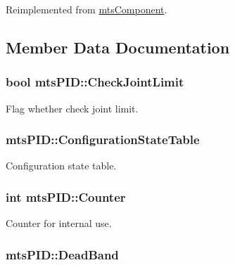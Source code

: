 Reimplemented from \hyperlink{classmts_component_aaf28f0262b44eb6866e10089a02fa6e4}{mts\-Component}.



\subsection{Member Data Documentation}
\hypertarget{classmts_p_i_d_a951636db1802cb277a716bd8ee8aea45}{
\subsubsection[{Check\-Joint\-Limit}]{\setlength{\rightskip}{0pt plus 5cm}bool mts\-P\-I\-D\-::\-Check\-Joint\-Limit\hspace{0.3cm}{\ttfamily [protected]}}}\label{classmts_p_i_d_a951636db1802cb277a716bd8ee8aea45}


Flag whether check joint limit. 

\hypertarget{classmts_p_i_d_a06df8f0f65fe6954383297ead5a689e8}{
\subsubsection[{Configuration\-State\-Table}]{ mts\-P\-I\-D\-::\-Configuration\-State\-Table\hspace{0.3cm}{\ttfamily [protected]}}}\label{classmts_p_i_d_a06df8f0f65fe6954383297ead5a689e8}


Configuration state table. 

\hypertarget{classmts_p_i_d_a7a1c2963d1d2b65a210464b9ef0d775f}{
\subsubsection[{Counter}]{\setlength{\rightskip}{0pt plus 5cm}int mts\-P\-I\-D\-::\-Counter\hspace{0.3cm}{\ttfamily [protected]}}}\label{classmts_p_i_d_a7a1c2963d1d2b65a210464b9ef0d775f}


Counter for internal use. 

\hypertarget{classmts_p_i_d_a1af99beeae2d49d92974919056a62c48}{
\subsubsection[{Dead\-Band}]{ mts\-P\-I\-D\-::\-Dead\-Band\hspace{0.3cm}{\ttfamily [protected]}}}\label{classmts_p_i_d_a1af99beeae2d49d92974919056a62c48}


